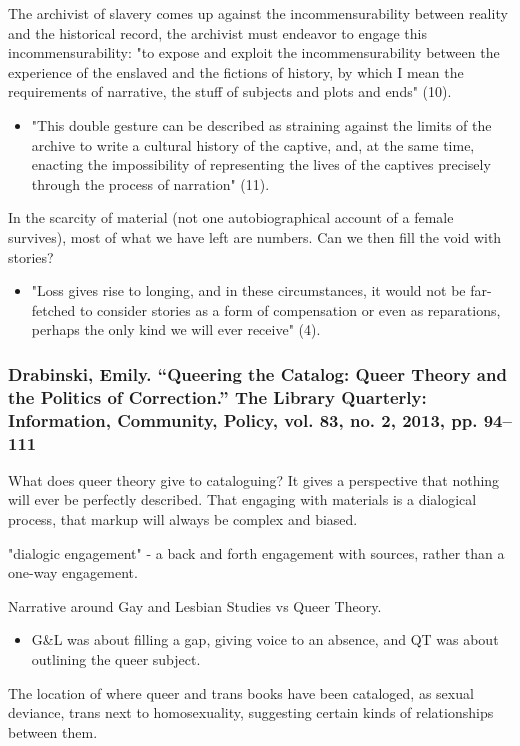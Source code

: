 \documentclass[11pt]{article}
\begin{document}
The archivist of slavery comes up against the incommensurability
between reality and the historical record, the archivist must endeavor
to engage this incommensurability: "to expose and exploit the
incommensurability between the experience of the enslaved and the
fictions of history, by which I mean the requirements of narrative,
the stuff of subjects and plots and ends" (10).
\begin{itemize}
\item "This double gesture can be described as straining against the
limits of the archive to write a cultural history of the captive,
and, at the same time, enacting the impossibility of representing
the lives of the captives precisely through the process of
narration" (11).
\end{itemize}

In the scarcity of material (not one autobiographical account of a
female survives), most of what we have left are numbers. Can we then
fill the void with stories? 
\begin{itemize}
\item "Loss gives rise to longing, and in these circumstances, it would
not be far-fetched to consider stories as a form of compensation or
even as reparations, perhaps the only kind we will ever receive"
(4).
\end{itemize}

\subsubsection{Drabinski, Emily. “Queering the Catalog: Queer Theory and the Politics of Correction.” The Library Quarterly: Information, Community, Policy, vol. 83, no. 2, 2013, pp. 94–111}
\label{sec:org8eb85e8}

What does queer theory give to cataloguing? It gives a perspective
that nothing will ever be perfectly described. That engaging with
materials is a dialogical process, that markup will always be complex
and biased.

"dialogic engagement" - a back and forth engagement with sources,
rather than a one-way engagement.

Narrative around Gay and Lesbian Studies vs Queer Theory.
\begin{itemize}
\item G\&L was about filling a gap, giving voice to an absence, and QT was
about outlining the queer subject.
\end{itemize}

The location of where queer and trans books have been cataloged, as
sexual deviance, trans next to homosexuality, suggesting certain kinds
of relationships between them.
\end{document}
